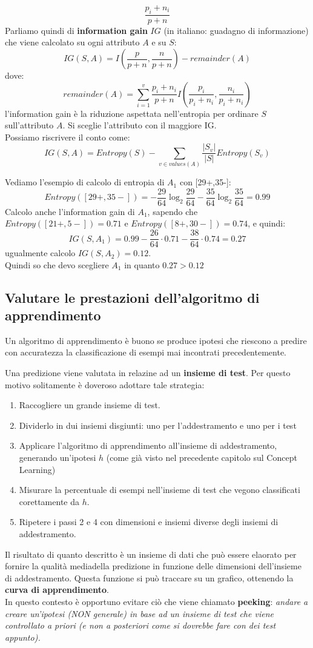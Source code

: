 \[\frac{p_i+n_i}{p+n}\]
Parliamo quindi di \textbf{information gain} $IG$ (in italiano: guadagno di informazione) che viene calcolato su ogni
attributo $A$ e su $S$:
\[IG(S,A)=I\left(\frac{p}{p+n},\frac{n}{p+n}\right)-remainder(A)\]
dove:
\[remainder(A)=\sum_{i=1}^v \frac{p_i+n_i}{p+n}
  I\left(\frac{p_i}{p_i+n_i},\frac{n_i}{p_i+n_i}\right)\]
l'information gain è la riduzione aspettata nell'entropia per ordinare
$S$ sull'attributo $A$. Si sceglie l'attributo con il maggiore IG.\\
Possiamo riscrivere il conto come:
\[IG(S,A)=Entropy(S)-\sum_{v\in values(A)}\frac{|S_v|}{|S|}Entropy(S_v)\]
\begin{esempio}
  Vediamo l'esempio di calcolo di entropia di $A_1$ con [29+,35-]:
  \[Entropy([29+,35-])=
    -\frac{29}{64}\log_2\frac{29}{64}-\frac{35}{64}\log_2\frac{35}{64}=0.99\]
  Calcolo anche l'information gain di $A_1$, sapendo che
  $Entropy([21+,5-])=0.71$ e $Entropy([8+,30-])=0.74$,
  e quindi:
  \[IG(S,A_1)=0.99-\frac{26}{64}\cdot 0.71-\frac{38}{64}\cdot 0.74=0.27\]
  ugualmente calcolo $IG(S,A_2)=0.12$. \\
  Quindi so che devo scegliere $A_1$ in quanto $0.27 > 0.12$
\end{esempio}
\subsection{Valutare le prestazioni dell'algoritmo di apprendimento}
\begin{definizione}
  Un algoritmo di apprendimento è buono se produce ipotesi che riescono a predire con accuratezza la classificazione di esempi mai incontrati precedentemente.
\end{definizione}
Una predizione viene valutata in relazine ad un \textbf{insieme di test}. Per questo motivo solitamente è doveroso adottare tale strategia:
\begin{enumerate}
    \item Raccogliere un grande insieme di test.
    \item Dividerlo in dui insiemi disgiunti: uno per l'addestramento e uno per i test
    \item Applicare l'algoritmo di apprendimento all'insieme di addestramento, generando un'ipotesi $h$ (come già visto nel precedente capitolo sul Concept Learning)
    \item Misurare la percentuale di esempi nell'insieme di test che vegono classificati corettamente da $h$.
    \item Ripetere i passi 2 e 4 con dimensioni e insiemi diverse degli insiemi di addestramento.
\end{enumerate}
Il risultato di quanto descritto è un insieme di dati che può essere elaorato per fornire la qualità mediadella predizione in funzione delle dimensioni dell'insieme di addestramento. Questa funzione si può traccare su un grafico, ottenendo la \textbf{curva di apprendimento}. \\ In questo contesto è opportuno evitare ciò che viene chiamato \textbf{peeking}: \textit{andare a creare un'ipotesi (NON generale) in base ad un insieme di test che viene controllato a priori (e non a posteriori come si dovrebbe fare con dei test appunto).}
